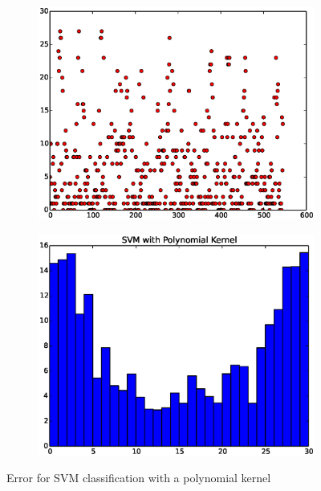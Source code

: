 \documentclass{article}
\begin{document}
\begin{figure}[H]
  \begin{subfigure}[!h]{0.5\textwidth}
    \centering
    \includegraphics[width=\textwidth]{./woodley/SVM_with_Polynomial_Kernel_heading_plot.eps}
    \label{img:woodley_sample}
  \end{subfigure}
  \begin{subfigure}[!h]{0.5\textwidth}
    \centering
    \includegraphics[width=\textwidth]{./woodley/SVM_with_Polynomial_Kernel_heading_bar.eps}
    \label{img:woodley_features}
  \end{subfigure}
  \caption{Error for SVM classification with a polynomial kernel}
\end{figure}
\end{document}
